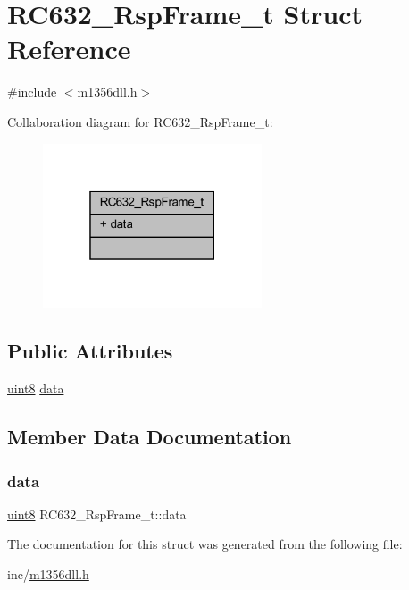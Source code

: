 \hypertarget{struct_r_c632___rsp_frame__t}{}\section{R\+C632\+\_\+\+Rsp\+Frame\+\_\+t Struct Reference}
\label{struct_r_c632___rsp_frame__t}


{\ttfamily \#include $<$m1356dll.\+h$>$}



Collaboration diagram for R\+C632\+\_\+\+Rsp\+Frame\+\_\+t\+:\nopagebreak
\begin{figure}[H]
\begin{center}
\leavevmode
\includegraphics[width=184pt]{struct_r_c632___rsp_frame__t__coll__graph}
\end{center}
\end{figure}
\subsection*{Public Attributes}
\begin{DoxyCompactItemize}
\item 
\mbox{\hyperlink{inc_2m1356dll_8h_adde6aaee8457bee49c2a92621fe22b79}{uint8}} \mbox{\hyperlink{struct_r_c632___rsp_frame__t_a5e6973773f2011cc4f40de26b391c2a9}{data}}
\end{DoxyCompactItemize}


\subsection{Member Data Documentation}
\mbox{\label{struct_r_c632___rsp_frame__t_a5e6973773f2011cc4f40de26b391c2a9}} 
\subsubsection{\texorpdfstring{data}{data}}
{\footnotesize\ttfamily \mbox{\hyperlink{inc_2m1356dll_8h_adde6aaee8457bee49c2a92621fe22b79}{uint8}} R\+C632\+\_\+\+Rsp\+Frame\+\_\+t\+::data}



The documentation for this struct was generated from the following file\+:\begin{DoxyCompactItemize}
\item 
inc/\mbox{\hyperlink{inc_2m1356dll_8h}{m1356dll.\+h}}\end{DoxyCompactItemize}
